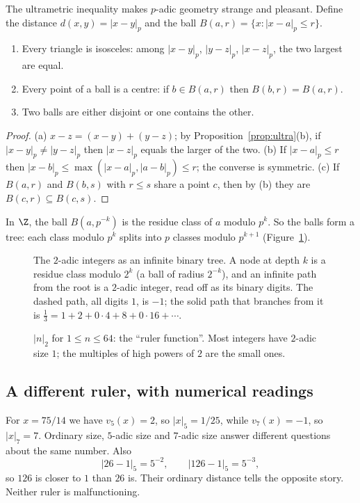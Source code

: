 The ultrametric inequality makes $p$-adic geometry strange and pleasant. Define the distance $d(x,y)=|x-y|_p$ and the ball $B(a,r)=\{x:|x-a|_p\le r\}$.

\begin{proposition}\label{prop:balls}
\begin{enumerate}[label=(\alph*)]
\item Every triangle is isosceles: among $|x-y|_p$, $|y-z|_p$, $|x-z|_p$, the two largest are equal.
\item Every point of a ball is a centre: if $b\in B(a,r)$ then $B(b,r)=B(a,r)$.
\item Two balls are either disjoint or one contains the other.
\end{enumerate}
\end{proposition}
\begin{proof}
(a) $x-z=(x-y)+(y-z)$; by Proposition~\ref{prop:ultra}(b), if $|x-y|_p\ne|y-z|_p$ then $|x-z|_p$ equals the larger of the two. (b) If $|x-a|_p\le r$ then $|x-b|_p\le\max(|x-a|_p,|a-b|_p)\le r$; the converse is symmetric. (c) If $B(a,r)$ and $B(b,s)$ with $r\le s$ share a point $c$, then by (b) they are $B(c,r)\subseteq B(c,s)$.
\end{proof}

In $\Z$, the ball $B(a,p^{-k})$ is the residue class of $a$ modulo $p^k$. So the balls form a tree: each class modulo $p^k$ splits into $p$ classes modulo $p^{k+1}$ (Figure~\ref{fig:tree}).

\begin{figure}[ht]
\centering
{}
\caption{The $2$-adic integers as an infinite binary tree. A node at depth $k$ is a residue class modulo $2^k$ (a ball of radius $2^{-k}$), and an infinite path from the root is a $2$-adic integer, read off as its binary digits. The dashed path, all digits $1$, is $-1$; the solid path that branches from it is $\frac13=1+2+0\cdot4+8+0\cdot16+\cdots$.}
\label{fig:tree}
\end{figure}

\begin{figure}[ht]
\centering
{}
\caption{$|n|_2$ for $1\le n\le 64$: the ``ruler function''. Most integers have $2$-adic size $1$; the multiples of high powers of $2$ are the small ones.}
\label{fig:ruler}
\end{figure}

\subsection*{A different ruler, with numerical readings}
For $x=75/14$ we have $v_5(x)=2$, so $|x|_5=1/25$, while
$v_7(x)=-1$, so $|x|_7=7$. Ordinary size, $5$-adic size and $7$-adic size
answer different questions about the same number.
Also
\[
|26-1|_5=5^{-2},\qquad |126-1|_5=5^{-3},
\]
so $126$ is closer to $1$ than $26$ is. Their ordinary distance tells the
opposite story. Neither ruler is malfunctioning.

